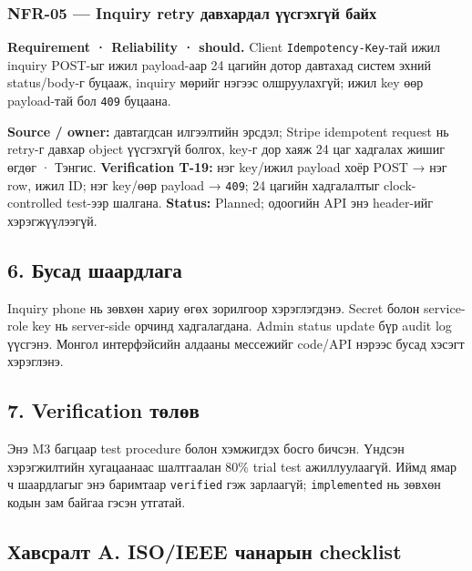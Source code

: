 \documentclass[
  mongolian,
]{article}
\begin{document}
\subsubsection{NFR-05 --- Inquiry retry давхардал үүсгэхгүй
байх}\label{nfr-05-inquiry-retry-ux434ux430ux432ux445ux430ux440ux434ux430ux43b-ux4afux4afux441ux433ux44dux445ux433ux4afux439-ux431ux430ux439ux445}

\textbf{Requirement · Reliability · should.} Client
\texttt{Idempotency-Key}-тай ижил inquiry POST-ыг ижил payload-аар 24
цагийн дотор давтахад систем эхний status/body-г буцааж, inquiry мөрийг
нэгээс олшруулахгүй; ижил key өөр payload-тай бол \texttt{409} буцаана.

\textbf{Source / owner:} давтагдсан илгээлтийн эрсдэл; Stripe idempotent
request нь retry-г давхар object үүсгэхгүй болгох, key-г дор хаяж 24 цаг
хадгалах жишиг өгдөг · Тэнгис. \textbf{Verification T-19:} нэг key/ижил
payload хоёр POST → нэг row, ижил ID; нэг key/өөр payload →
\texttt{409}; 24 цагийн хадгалалтыг clock-controlled test-ээр шалгана.
\textbf{Status:} Planned; одоогийн API энэ header-ийг хэрэгжүүлээгүй.

\subsection{6. Бусад
шаардлага}\label{ux431ux443ux441ux430ux434-ux448ux430ux430ux440ux434ux43bux430ux433ux430}

Inquiry phone нь зөвхөн хариу өгөх зорилгоор хэрэглэгдэнэ. Secret болон
service-role key нь server-side орчинд хадгалагдана. Admin status update
бүр audit log үүсгэнэ. Монгол интерфэйсийн алдааны мессежийг code/API
нэрээс бусад хэсэгт хэрэглэнэ.

\subsection{7. Verification
төлөв}\label{verification-ux442ux4e9ux43bux4e9ux432}

Энэ M3 багцаар test procedure болон хэмжигдэх босго бичсэн. Үндсэн
хэрэгжилтийн хугацаанаас шалтгаалан 80\% trial test ажиллуулаагүй. Иймд
ямар ч шаардлагыг энэ баримтаар \texttt{verified} гэж зарлаагүй;
\texttt{implemented} нь зөвхөн кодын зам байгаа гэсэн утгатай.

\subsection{Хавсралт A. ISO/IEEE чанарын
checklist}\label{ux445ux430ux432ux441ux440ux430ux43bux442-a.-isoieee-ux447ux430ux43dux430ux440ux44bux43d-checklist}
\end{document}
